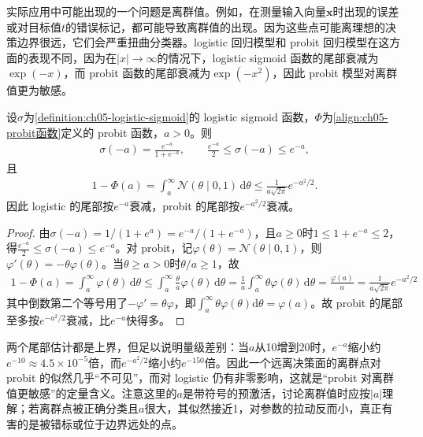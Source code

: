 \documentclass[../../main.tex]{subfiles}
\begin{document}
实际应用中可能出现的一个问题是离群值。例如，在测量输入向量$\boldsymbol{x}$时出现的误差或对目标值$t$的错误标记，都可能导致离群值的出现。因为这些点可能离理想的决策边界很远，它们会严重扭曲分类器。logistic 回归模型和 probit 回归模型在这方面的表现不同，因为在$|x|\to\infty$的情况下，logistic sigmoid 函数的尾部衰减为$\exp(-x)$，而 probit 函数的尾部衰减为$\exp(-x^{2})$，因此 probit 模型对离群值更为敏感。

\begin{proposition}[尾部衰减的比较]\label{proposition:ch05-尾部衰减}
设$\sigma$为\cref{definition:ch05-logistic-sigmoid}的 logistic sigmoid 函数，$\Phi$为\eqref{align:ch05-probit函数}定义的 probit 函数，$a>0$。则
\begin{align}
  \sigma(-a)=\frac{e^{-a}}{1+e^{-a}},\qquad \frac{e^{-a}}{2}\leqslant\sigma(-a)\leqslant e^{-a},
\end{align}
且
\begin{align}
  1-\Phi(a)=\int_{a}^{\infty}\mathcal{N}(\theta\mid0,1)\,\mathrm{d}\theta\leqslant\frac{1}{a\sqrt{2\pi}}e^{-a^{2}/2}.
\end{align}
因此 logistic 的尾部按$e^{-a}$衰减，probit 的尾部按$e^{-a^{2}/2}$衰减。
\end{proposition}

\begin{proof}
由$\sigma(-a)=1/(1+e^{a})=e^{-a}/(1+e^{-a})$，且$a\geqslant0$时$1\leqslant1+e^{-a}\leqslant2$，得$\frac{e^{-a}}{2}\leqslant\sigma(-a)\leqslant e^{-a}$。对 probit，记$\varphi(\theta)=\mathcal{N}(\theta\mid0,1)$，则$\varphi'(\theta)=-\theta\varphi(\theta)$。当$\theta\geqslant a>0$时$\theta/a\geqslant1$，故
\begin{align}
  1-\Phi(a)=\int_{a}^{\infty}\varphi(\theta)\,\mathrm{d}\theta\leqslant\int_{a}^{\infty}\frac{\theta}{a}\varphi(\theta)\,\mathrm{d}\theta=\frac{1}{a}\int_{a}^{\infty}\theta\varphi(\theta)\,\mathrm{d}\theta=\frac{\varphi(a)}{a}=\frac{1}{a\sqrt{2\pi}}e^{-a^{2}/2}
\end{align}
其中倒数第二个等号用了$-\varphi'=\theta\varphi$，即$\int_a^\infty\theta\varphi(\theta)\mathrm{d}\theta=\varphi(a)$。故 probit 的尾部至多按$e^{-a^{2}/2}$衰减，比$e^{-a}$快得多。
\end{proof}

\begin{remark}
两个尾部估计都是上界，但足以说明量级差别：当$a$从10增到20时，$e^{-a}$缩小约$e^{-10}\approx4.5\times10^{-5}$倍，而$e^{-a^{2}/2}$缩小约$e^{-150}$倍。因此一个远离决策面的离群点对 probit 的似然几乎“不可见”，而对 logistic 仍有非零影响，这就是“probit 对离群值更敏感”的定量含义。注意这里的$a$是带符号的预激活，讨论离群值时应按$|a|$理解；若离群点被正确分类且$a$很大，其似然接近1，对参数的拉动反而小，真正有害的是被错标或位于边界远处的点。
\end{remark}
\end{document}

